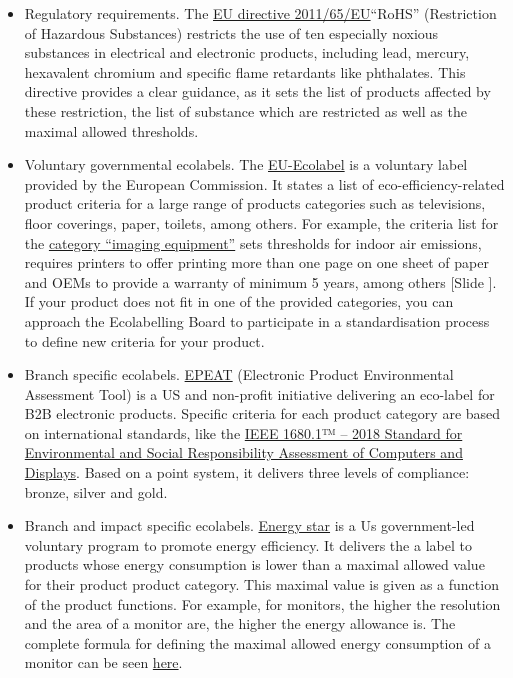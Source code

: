 \documentclass{article}
\newcounter{slide}
\begin{document}
\begin{itemize}
	\item Regulatory requirements. The \href{https://eur-lex.europa.eu/legal-content/EN/TXT/?qid=1399998664957&uri=CELEX:02011L0065-20140129}{EU directive 2011/65/EU}``RoHS'' (Restriction of Hazardous Substances) restricts the use of ten especially noxious substances in electrical and electronic products, including lead, mercury, hexavalent chromium and specific flame retardants like phthalates. This directive provides a clear guidance, as it sets the list of products affected by these restriction, the list of substance which are restricted as well as the maximal allowed thresholds.
	\item Voluntary governmental ecolabels. The \href{http://ec.europa.eu/environment/ecolabel/}{EU-Ecolabel} is a voluntary label provided by the European Commission. It states a list of eco-efficiency-related product criteria for a large range of products categories such as televisions, floor coverings, paper, toilets, among others. For example, the criteria list for the \href{https://eur-lex.europa.eu/LexUriServ/LexUriServ.do?uri=OJ:L:2013:353:0053:0063:EN:PDF}{category ``imaging equipment''} sets thresholds for indoor air emissions, requires printers to offer printing more than one page on one sheet of paper and OEMs to provide a warranty of minimum 5 years, among others {\color{blue}[Slide ]}. If your product does not fit in one of the provided categories, you can approach the Ecolabelling Board to participate in a standardisation process to define new criteria for your product. 
	\item Branch specific ecolabels. \href{http://greenelectronicscouncil.org/epeat/epeat-overview/}{EPEAT} (Electronic Product Environmental Assessment Tool) is a US and non-profit initiative delivering an eco-label for B2B electronic products. Specific criteria for each product category are based on international standards, like the \href{https://ieeexplore.ieee.org/document/8320570/}{IEEE 1680.1™ – 2018 Standard for Environmental and Social Responsibility Assessment of Computers and Displays}. Based on a point system, it delivers three levels of compliance: bronze, silver and gold.
	\item Branch and impact specific ecolabels. \href{https://www.energystar.gov/}{Energy star} is a Us government-led voluntary program to promote energy efficiency. It delivers the a label to products whose energy consumption is lower than a maximal allowed value for their product product category. This maximal value is given as a function of the product functions. For example, for monitors, the higher the resolution and the area of a monitor are, the higher the energy allowance is. The complete formula for defining the maximal allowed energy consumption of a monitor can be seen \href{https://www.energystar.gov/products/office_equipment/displays/displays_key_product_criteria}{here}.
\end{itemize}
\end{document}
